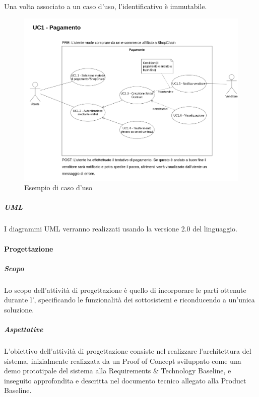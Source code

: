 Una volta associato a un caso d'uso, l'identificativo è immutabile.
\begin{figure}[H]
    \centering
    \includegraphics[scale=0.3]{../template/images/useCases/useCase.png}
    \caption{Esempio di caso d'uso}
\end{figure}

\subparagraph{UML} \label{subparagraph:UML}
I diagrammi UML\glo{} verranno realizzati usando la versione 2.0 del linguaggio.

\paragraph{Progettazione} \label{paragraph:Progettazione}

\subparagraph{Scopo} \label{subparagraph:Progettazione_Scopo}
Lo scopo dell'attività di progettazione è quello di incorporare le parti ottenute durante l'\docNameAdRLow{}, specificando le funzionalità dei sottosistemi
e riconducendo a un'unica soluzione.

\subparagraph{Aspettative} \label{subparagraph:Progettazione_Aspettative}
L'obiettivo dell'attività di progettazione consiste nel realizzare l'architettura del sistema, inizialmente realizzata da un Proof of Concept\glo{} sviluppato come
una demo prototipale del sistema alla Requirements \& Technology Baseline, e inseguito approfondita e descritta nel documento tecnico allegato alla Product Baseline.

